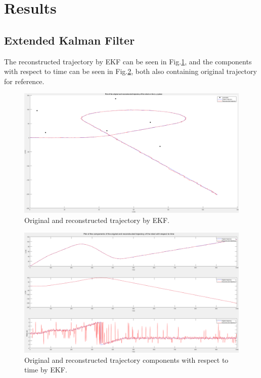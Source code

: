 \section{Results}

\subsection{Extended Kalman Filter}
The reconstructed trajectory by EKF can be seen in Fig.\:\ref{fig:EKF_trajectory}, and the components with respect to time can be seen in Fig.\:\ref{fig:EKF_subplot}, both also containing original trajectory for reference.
\begin{figure}
    \centering
    \includegraphics[width=\columnwidth]{images/EKF_trajectory.png}
    \caption{Original and reconstructed trajectory by EKF.}
    \label{fig:EKF_trajectory}
\end{figure}
\begin{figure}
    \centering
    \includegraphics[width=\columnwidth]{images/EKF_subplot.png}
    \caption{Original and reconstructed trajectory components with respect to time by EKF.}
    \label{fig:EKF_subplot}
\end{figure}


